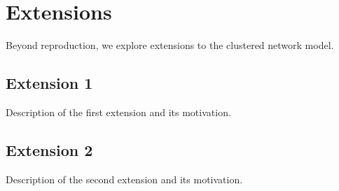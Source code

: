 \section{Extensions}
\label{sec:extensions}

Beyond reproduction, we explore extensions to the clustered network model.

\subsection{Extension 1}

Description of the first extension and its motivation.

\subsection{Extension 2}

Description of the second extension and its motivation.
